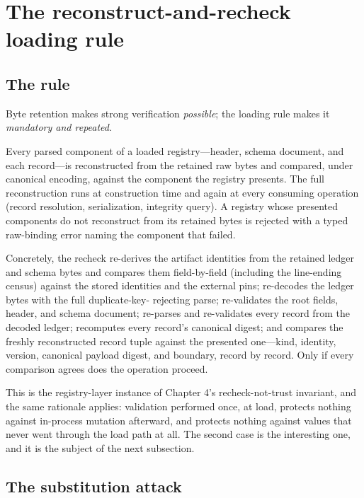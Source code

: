 \section{The reconstruct-and-recheck loading rule}\label{ch06:recheck}

\subsection{The rule}

Byte retention makes strong verification \emph{possible}; the loading rule
makes it \emph{mandatory and repeated}.

\begin{ruleenv}\label{ch06:rule:reconstruct}
Every parsed component of a loaded registry---header, schema document, and
each record---is reconstructed from the retained raw bytes and compared,
under canonical encoding, against the component the registry presents.
The full reconstruction runs at construction time and again at every
consuming operation (record resolution, serialization, integrity query).
A registry whose presented components do not reconstruct from its
retained bytes is rejected with a typed raw-binding error naming the
component that failed.
\end{ruleenv}

Concretely, the recheck re-derives the artifact identities from the
retained ledger and schema bytes and compares them field-by-field
(including the line-ending census) against the stored identities and the
external pins; re-decodes the ledger bytes with the full duplicate-key-
rejecting parse; re-validates the root fields, header, and schema
document; re-parses and re-validates every record from the decoded
ledger; recomputes every record's canonical digest; and compares the
freshly reconstructed record tuple against the presented one---kind,
identity, version, canonical payload digest, and boundary, record by
record. Only if every comparison agrees does the operation proceed.

This is the registry-layer instance of Chapter 4's recheck-not-trust
invariant, and the same rationale applies: validation performed once, at
load, protects nothing against in-process mutation afterward, and
protects nothing against values that never went through the load path at
all. The second case is the interesting one, and it is the subject of the
next subsection.

\subsection{The substitution attack}\label{ch06:attack}

